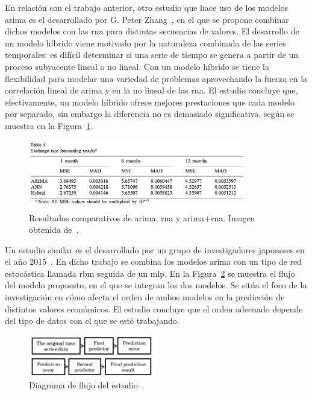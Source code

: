 En relación con el trabajo anterior, otro estudio que hace uso de los modelos \acrshort{arima} es el desarrollado por G. Peter Zhang~\cite{arimann}, en el que se propone combinar dichos modelos con las \acrshort{rna} para distintas secuencias de valores. El desarrollo de un modelo híbrido viene motivado por la naturaleza combinada de las series temporales: es difícil determinar si una serie de tiempo se genera a partir de un proceso subyacente lineal o no lineal. Con un modelo híbrido se tiene la flexibilidad para modelar una variedad de problemas aprovechando la fuerza en la correlación lineal de \acrshort{arima} y en la no lineal de las \acrshort{rna}. El estudio concluye que, efectivamente, un modelo híbrido ofrece mejores prestaciones que cada modelo por separado, sin embargo la diferencia no es demasiado significativa, según se muestra en la Figura~\ref{fig.arimann}.\\

\begin{figure}[H]
	\begin{center}
		\includegraphics[width=0.85\textwidth]{ figures/estadoarte/ARIMA+NN.png}
		\caption{Resultados comparativos de \acrshort{arima}, \acrshort{rna} y \acrshort{arima}+\acrshort{rna}. Imagen obtenida de~\cite{arimann}.
		}
		\label{fig.arimann}
	\end{center}
\end{figure}
\vspace{-10pt}

Un estudio similar es el desarrollado por un grupo de investigadores japoneses en el año 2015~\cite{dbnARIMA}. En dicho trabajo se combina los modelos \acrshort{arima} con un tipo de red estocástica llamada \acrfull{rbm} seguida de un \acrshort{mlp}. En la Figura~\ref{fig.dbnarima} se muestra el flujo del modelo propuesto, en el que se integran los dos modelos. Se sitúa el foco de la investigación en cómo afecta el orden de ambos modelos en la predicción de distintos valores económicos. El estudio concluye que el orden adecuado depende del tipo de datos con el que se esté trabajando.
\vspace{10pt}
\begin{figure}[H]
	\begin{center}
		\includegraphics[width=0.5\textwidth]{ figures/estadoarte/flujo_dbn.png}
		\caption{Diagrama de flujo del estudio~\cite{dbnARIMA}.
		}
		\label{fig.dbnarima}
	\end{center}
\end{figure}
\vspace{-10pt}

